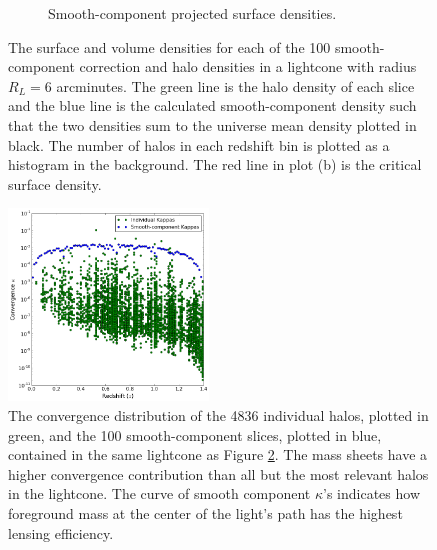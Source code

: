 \documentclass[%
 reprint,
 amsmath,amssymb,
 aps,nofootinbib
]{revtex4-1}
\begin{document}
\begin{figure}
\begin{subfigure}[H]{0.48\textwidth}
        \caption{Smooth-component projected surface densities.}
        \label{fig:surface_densities}
    \end{subfigure}
    \captionsetup{justification=raggedright,singlelinecheck=false}
    \caption{The surface and volume densities for each of the 100 smooth-component correction and halo densities in a lightcone with radius $R_L=6$ arcminutes. The green line is the halo density of each slice and the blue line is the calculated smooth-component density such that the two densities sum to the universe mean density plotted in black. The number of halos in each redshift bin is plotted as a histogram in the background. The red line in plot (b) is the critical surface density.}
    \label{densities}
\end{figure}

\begin{figure}
    \centering
    \includegraphics[width=0.475\textwidth]{figs-swe/thesis/kappa_distribution.png}
    \captionsetup{justification=raggedright,singlelinecheck=false}
    \caption{The convergence distribution of the 4836 individual halos, plotted in green, and the 100 smooth-component slices, plotted in blue, contained in the same lightcone as Figure \ref{densities}. The mass sheets have a higher convergence contribution than all but the most relevant halos in the lightcone. The curve of smooth component $\kappa$'s indicates how foreground mass at the center of the light's path has the highest lensing efficiency.}
    \label{fig:kappa_dist}
\end{figure}
\end{document}
